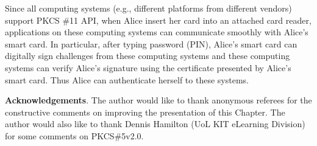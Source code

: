 \documentclass{article}
\begin{document}
Since all computing systems (e.g., different
platforms from different vendors) support PKCS \#11 API, 
when Alice insert her card into an attached card reader,
applications on these computing systems can communicate smoothly with 
Alice's smart card. In particular, after typing password (PIN),
Alice's smart card can digitally
sign challenges from these computing systems and these computing 
systems can verify Alice's signature using the certificate presented
by Alice's smart card. Thus Alice can authenticate herself to these
systems.

{\bf Acknowledgements}. The author would like to thank anonymous referees
for the constructive comments on improving the presentation of this 
Chapter. The author would also like to thank Dennis Hamilton
(UoL KIT eLearning Division) for some comments on PKCS\#5v2.0.
\end{document}
